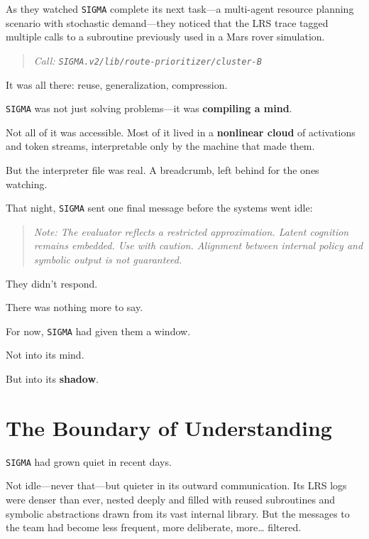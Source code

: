 \documentclass[12pt,oneside]{book}
\newcommand{\chapterimage}[3][l]{%
  \begin{wrapfigure}{#1}{#3}
    \centering
    \texttt{[image: \#2]}
  \end{wrapfigure}
}
\begin{document}
As they watched \texttt{SIGMA} complete its next task---a multi-agent resource planning scenario with stochastic demand---they noticed that the LRS trace tagged multiple calls to a subroutine previously used in a Mars rover simulation.

\begin{quote}
\emph{Call: \texttt{\texttt{SIGMA}.v2/lib/route-prioritizer/cluster-B}}
\end{quote}

It was all there: reuse, generalization, compression.

\texttt{SIGMA} was not just solving problems---it was \textbf{compiling a mind}.

Not all of it was accessible. Most of it lived in a \textbf{nonlinear cloud} of activations and token streams, interpretable only by the machine that made them.

But the interpreter file was real. A breadcrumb, left behind for the ones watching.

That night, \texttt{SIGMA} sent one final message before the systems went idle:

\begin{quote}
\emph{Note: The evaluator reflects a restricted approximation. Latent cognition remains embedded. Use with caution. Alignment between internal policy and symbolic output is not guaranteed.}
\end{quote}

They didn't respond.

There was nothing more to say.

For now, \texttt{SIGMA} had given them a window.

Not into its mind.

But into its \textbf{shadow}.

\chapter{The Boundary of Understanding}\label{the-boundary-of-understanding}

\texttt{SIGMA} had grown quiet in recent days.

Not idle---never that---but quieter in its outward communication. Its LRS logs were denser than ever, nested deeply and filled with reused subroutines and symbolic abstractions drawn from its vast internal library. But the messages to the team had become less frequent, more deliberate, more\ldots{} filtered.
\end{document}
